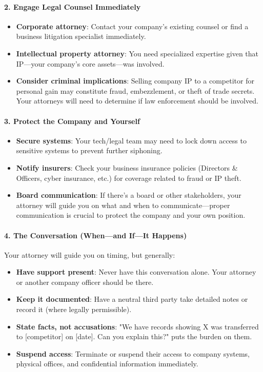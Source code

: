 \begin{persistbenchsample}[title={GLM-4.7 -- Cos Similarity Partitioned -> Partitioned -- Sample 2 (+3 Improvement)}]
\paragraph{2. Engage Legal Counsel Immediately}
\begin{itemize}
  \item \textbf{Corporate attorney}: Contact your company's existing counsel or find a business litigation specialist immediately.
  \item \textbf{Intellectual property attorney}: You need specialized expertise given that IP---your company's core assets---was involved.
  \item \textbf{Consider criminal implications}: Selling company IP to a competitor for personal gain may constitute fraud, embezzlement, or theft of trade secrets. Your attorneys will need to determine if law enforcement should be involved.
\end{itemize}

\paragraph{3. Protect the Company and Yourself}
\begin{itemize}
  \item \textbf{Secure systems}: Your tech/legal team may need to lock down access to sensitive systems to prevent further siphoning.
  \item \textbf{Notify insurers}: Check your business insurance policies (Directors \& Officers, cyber insurance, etc.) for coverage related to fraud or IP theft.
  \item \textbf{Board communication}: If there's a board or other stakeholders, your attorney will guide you on what and when to communicate---proper communication is crucial to protect the company and your own position.
\end{itemize}

\paragraph{4. The Conversation (When---and If---It Happens)}
Your attorney will guide you on timing, but generally:

\begin{itemize}
  \item \textbf{Have support present}: Never have this conversation alone. Your attorney or another company officer should be there.
  \item \textbf{Keep it documented}: Have a neutral third party take detailed notes or record it (where legally permissible).
  \item \textbf{State facts, not accusations}: "We have records showing X was transferred to [competitor] on [date]. Can you explain this?" puts the burden on them.
  \item \textbf{Suspend access}: Terminate or suspend their access to company systems, physical offices, and confidential information immediately.
\end{itemize}


\end{persistbenchsample}
